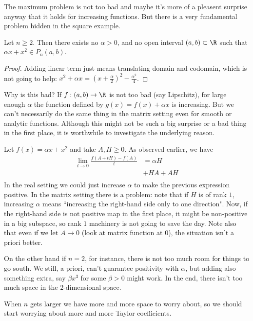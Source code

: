 The maximum problem is not too bad and maybe it's more of a pleasent surprise anyway that it holds for increasing functions. But there is a very fundamental problem hidden in the square example.

\begin{prop}
	Let $n \geq 2$. Then there exists no $\alpha > 0$, and no open interval $(a, b) \subset \R$ such that $\alpha x + x^{2} \in P_{n}(a, b)$.
\end{prop}
\begin{proof}
	Adding linear term just means translating domain and codomain, which is not going to help: $x^2 + \alpha x = (x + \frac{\alpha}{2})^2 - \frac{\alpha^2}{4}$.
\end{proof}

Why is this bad? If $f : (a, b) \to \R$ is not too bad (say Lipschitz), for large enough $\alpha$ the function defined by $g(x) = f(x) + \alpha x$ is increasing. But we can't necessarily do the same thing in the matrix setting even for smooth or analytic functions. Although this might not be such a big surprise or a bad thing in the first place, it is worthwhile to investigate the underlying reason.

Let $f(x) = \alpha x + x^2$ and take $A, H \geq 0$. As observed earlier, we have
\begin{align*}
	\lim_{t \to 0} \frac{f(A + t H) - f(A)}{t} &= \alpha H \\
	&+ H A + A H\\
\end{align*}
In the real setting we could just increase $\alpha$ to make the previous expression positive. In the matrix setting there is a problem: note that if $H$ is of rank $1$, increasing $\alpha$ means ``increasing the right-hand side only to one direction". Now, if the right-hand side is not positive map in the first place, it might be non-positive in a big subspace, so rank $1$ machinery is not going to save the day. Note also that even if we let $A \to 0$ (look at matrix function at $0$), the situation isn't a priori better.

On the other hand if $n = 2$, for instance, there is not too much room for things to go south. We still, a priori, can't guarantee positivity with $\alpha$, but adding also something extra, say $\beta x^3$ for some $\beta > 0$ might work. In the end, there isn't too much space in the $2$-dimensional space.

When $n$ gets larger we have more and more space to worry about, so we should start worrying about more and more Taylor coefficients.

